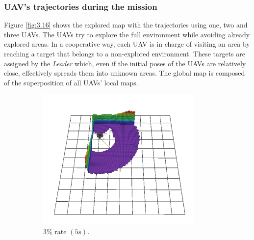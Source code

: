 \documentclass[11pt,openany]{book}
\begin{document}
\subsubsection{UAV's trajectories during the mission}
Figure \ref{fig:3.16} shows the explored map with the trajectories using one, two and three UAVs. The UAVs try to explore the full environment while avoiding already explored areas. In a cooperative way, each UAV is in charge of visiting an area by reaching a target that belongs to a non-explored environment. These targets are assigned by the \textit{Leader} which, even if the initial poses of the UAVs are relatively close, effectively spreads them into unknown areas. The global map is composed of the superposition of all UAVs’ local maps.
\begin{figure}[H]
    \centering
    \begin{subfigure}[H]{0.3\linewidth}
        \centering
        \includegraphics[width=\linewidth]{assets/3_13_a.png}
        \caption{{$3\%$ rate $(5s).$}}
        \label{fig:3.13a}
    \end{subfigure}
    \begin{subfigure}[H]{0.3\linewidth}
        \centering

\end{subfigure}
\end{figure}
\end{document}
